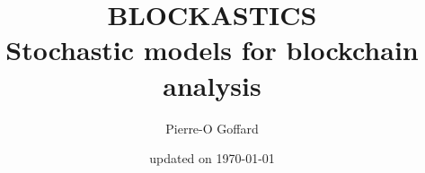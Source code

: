 \documentclass[a4paper]{report}
\begin{document}
\title{BLOCKASTICS\\
[0.2em]\smaller{}Stochastic models for blockchain analysis}
\author{Pierre-O Goffard}

\date{updated on \today} 
\maketitle

\tableofcontents








\end{document}
